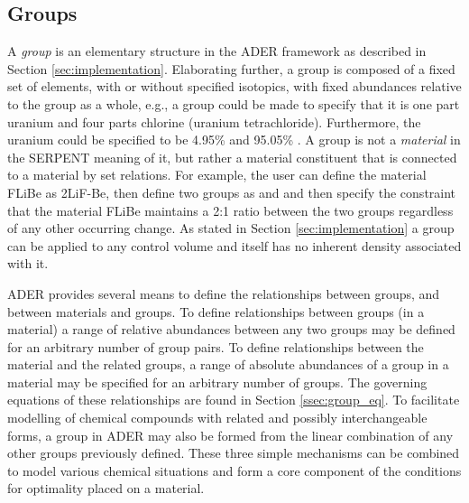 
\subsection{Groups} \label{ssec:groups}
A \textit{group} is an elementary structure in the ADER framework as described 
in Section \ref{sec:implementation}.
Elaborating further, a group is composed of a fixed set of elements, with or 
without specified isotopics, with fixed abundances relative to the group as a 
whole, e.g.,  a group could be made to specify that it is one part uranium and 
four parts chlorine (uranium tetrachloride). Furthermore, the uranium could be 
specified to be 4.95\%  and 95.05\% . 
A group is not a \textit{material} in the SERPENT meaning of it, but rather a 
material constituent that is connected to a material by set relations. 
For example, the user can define the material FLiBe as 2LiF-Be, 
then define two groups as  and  and then specify the 
constraint that the material FLiBe maintains a  2:1 ratio between the two 
groups regardless of any other occurring change. As stated in Section 
\ref{sec:implementation} a group can be applied to any control volume and 
itself has no inherent density associated with it.

ADER provides several means to define the relationships between groups, and 
between  materials and groups. To define relationships between groups (in a
material) a range of relative abundances between any two groups
may be defined for an arbitrary number of group pairs. To define relationships
between the material and the related groups, a range of absolute abundances of 
a group in a material may be specified for an arbitrary number of groups. 
The governing equations of these relationships are found in 
Section \ref{ssec:group_eq}. To facilitate modelling
of chemical compounds with related and possibly interchangeable forms, a group
in ADER may also be formed from the linear combination of any other groups
previously defined. These three simple mechanisms can be combined to model
various chemical situations and form a core component of the conditions for
optimality placed on a material. 

